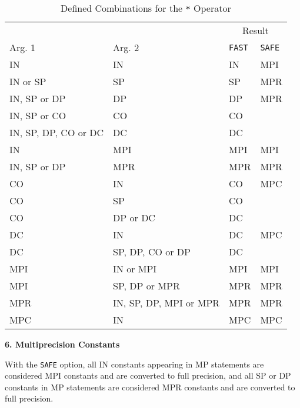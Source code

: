 \begin{table} \begin{center}
\begin{tabular}{|l|l|l|l|}
\hline
                &                      & \multicolumn{2}{|c|}{Result} \\
   Arg. 1       &  Arg. 2                 & {\tt FAST} & {\tt SAFE} \\
\hline
   IN           &  IN                     &  IN        & MPI \\
   IN or SP     &  SP                     &  SP        & MPR \\
   IN, SP or DP &  DP                     &  DP        & MPR \\
   IN, SP or CO &  CO                     &  CO        &     \\
   IN, SP, DP, CO or DC &  DC             &  DC        &     \\
   IN           &  MPI                    &  MPI       & MPI \\
   IN, SP or DP &  MPR                    &  MPR       & MPR \\
   CO           &  IN                     &  CO        & MPC \\
   CO           &  SP                     &  CO        &     \\
   CO           &  DP or DC               &  DC        &     \\
   DC           &  IN                     &  DC        & MPC \\
   DC           &  SP, DP, CO or DP       &  DC        &     \\
   MPI          &  IN or MPI              &  MPI       & MPI \\
   MPI          &  SP, DP or MPR          &  MPR       & MPR \\
   MPR          &  IN, SP, DP, MPI or MPR &  MPR       & MPR \\
   MPC          &  IN                     &  MPC       & MPC \\
\hline
\end{tabular}
\caption{Defined Combinations for the {\tt **} Operator}
\end{center} \end{table}

\vspace{2ex} \noindent
{\bf 6. Multiprecision Constants}

With the {\tt SAFE} option, all IN constants appearing in MP
statements are considered MPI constants and are converted to full
precision, and all SP or DP constants in MP statements are considered
MPR constants and are converted to full precision.

